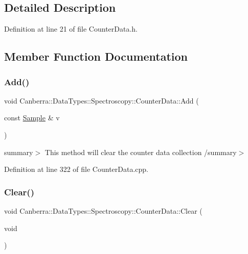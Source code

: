 \subsection{Detailed Description}


Definition at line 21 of file Counter\+Data.\+h.



\subsection{Member Function Documentation}
\mbox{\label{class_canberra_1_1_data_types_1_1_spectroscopy_1_1_counter_data_a2f684fd84f57e87148a1b057e5bace72_a2f684fd84f57e87148a1b057e5bace72}} 
\subsubsection{\texorpdfstring{Add()}{Add()}}
{\footnotesize\ttfamily void Canberra\+::\+Data\+Types\+::\+Spectroscopy\+::\+Counter\+Data\+::\+Add (\begin{DoxyParamCaption}\item[{const \hyperlink{class_canberra_1_1_data_types_1_1_spectroscopy_1_1_counter_data_1_1_sample}{Sample} \&}]{v }\end{DoxyParamCaption})}

summary$>$ This method will clear the counter data collection /summary$>$ 

Definition at line 322 of file Counter\+Data.\+cpp.

\mbox{\label{class_canberra_1_1_data_types_1_1_spectroscopy_1_1_counter_data_a00971d06ce65981fd8f6a37949843b41_a00971d06ce65981fd8f6a37949843b41}} 
\subsubsection{\texorpdfstring{Clear()}{Clear()}}
{\footnotesize\ttfamily void Canberra\+::\+Data\+Types\+::\+Spectroscopy\+::\+Counter\+Data\+::\+Clear (\begin{DoxyParamCaption}\item[{void}]{ }\end{DoxyParamCaption})}

